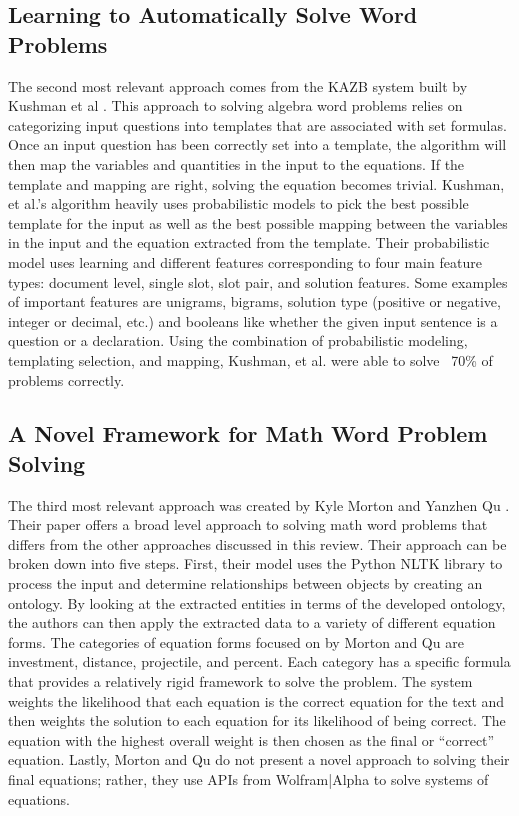 \documentclass[11pt]{article}
\begin{document}
\subsection{Learning to Automatically Solve Word Problems}
The second most relevant approach comes from the KAZB system built by Kushman et al . This approach to solving algebra word problems relies on categorizing input questions into templates that are associated with set formulas. Once an input question has been correctly set into a template, the algorithm will then map the variables and quantities in the input to the equations. If the template and mapping are right, solving the equation becomes trivial. Kushman, et al.'s algorithm heavily uses probabilistic models to pick the best possible template for the input as well as the best possible mapping between the variables in the input and the equation extracted from the template. Their probabilistic model uses learning and different features corresponding to four main feature types: document level, single slot, slot pair, and solution features. Some examples of important features are unigrams, bigrams, solution type (positive or negative, integer or decimal, etc.) and booleans like whether the given input sentence is a question or a declaration. Using the combination of probabilistic modeling, templating selection, and mapping, Kushman, et al. were able to solve ~70\% of problems correctly.

\subsection{A Novel Framework for Math Word Problem Solving}
The third most relevant approach was created by Kyle Morton and Yanzhen Qu . Their paper offers a broad level approach to solving math word problems that differs from the other approaches discussed in this review. Their approach can be broken down into five steps. First, their model uses the Python NLTK library to process the input and determine relationships between objects by creating an ontology. By looking at the extracted entities in terms of the developed ontology, the authors can then apply the extracted data to a variety of different equation forms. The categories of equation forms focused on by Morton and Qu are investment, distance, projectile, and percent. Each category has a specific formula that provides a relatively rigid framework to solve the problem. The system weights the likelihood that each equation is the correct equation for the text and then weights the solution to each equation for its likelihood of being correct. The equation with the highest overall weight is then chosen as the final or ``correct'' equation. Lastly, Morton and Qu do not present a novel approach to solving their final equations; rather, they use APIs from Wolfram|Alpha to solve systems of equations.
\end{document}

